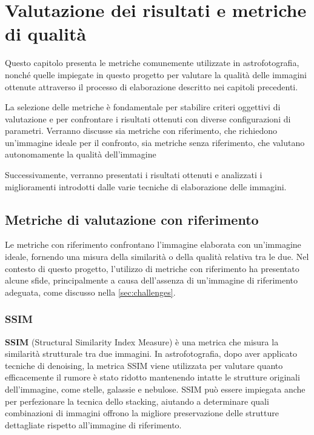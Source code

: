 \chapter{Valutazione dei risultati e metriche di qualità} \label{chap:evaluation}

Questo capitolo presenta le metriche comunemente utilizzate in astrofotografia, nonché quelle impiegate in questo progetto per valutare la qualità delle immagini ottenute attraverso il processo di elaborazione descritto nei capitoli precedenti.

La selezione delle metriche è fondamentale per stabilire criteri oggettivi di valutazione e per confrontare i risultati ottenuti con diverse configurazioni di parametri. Verranno discusse sia metriche con riferimento, che richiedono un'immagine ideale per il confronto, sia metriche senza riferimento, che valutano autonomamente la qualità dell'immagine

Successivamente, verranno presentati i risultati ottenuti e analizzati i miglioramenti introdotti dalle varie tecniche di elaborazione delle immagini.


\section{Metriche di valutazione con riferimento} \label{sec:r_metrics}

Le metriche con riferimento confrontano l'immagine elaborata con un'immagine ideale, fornendo una misura della similarità o della qualità relativa tra le due. Nel contesto di questo progetto, l'utilizzo di metriche con riferimento ha presentato alcune sfide, principalmente a causa dell'assenza di un'immagine di riferimento adeguata, come discusso nella \cref{sec:challenges}.

\subsection{SSIM} \label{subsec:ssim}

\textbf{SSIM} (Structural Similarity Index Measure) è una metrica che misura la similarità strutturale tra due immagini. In astrofotografia, dopo aver applicato tecniche di denoising, la metrica SSIM viene utilizzata per valutare quanto efficacemente il rumore è stato ridotto mantenendo intatte le strutture originali dell'immagine, come stelle, galassie e nebulose. SSIM può essere impiegata anche per perfezionare la tecnica dello stacking, aiutando a determinare quali combinazioni di immagini offrono la migliore preservazione delle strutture dettagliate rispetto all'immagine di riferimento.

